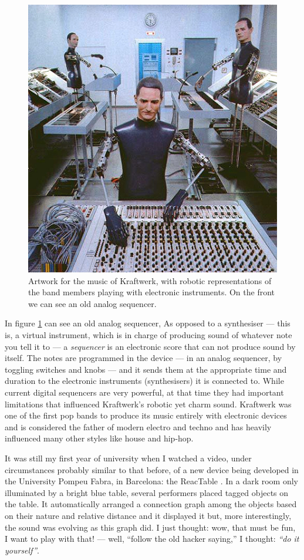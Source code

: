 \begin{figure}[h!]
    \centering
  \includegraphics[width=.6\textwidth]{pic/kraftwerk.jpg}
  \caption[Artwork for the music of Kraftwerk]{Artwork for the music
    of Kraftwerk, with robotic representations of the band members
    playing with electronic instruments. On the front we can see an
    old analog sequencer.}
  \label{fig:kraftwerk}
\end{figure}

\begin{mynote}
  In figure \ref{fig:kraftwerk} can see an old analog sequencer, As
  opposed to a synthesiser --- this is, a virtual
  instrument, which is in charge of
  producing sound of whatever note you tell it to --- a
  \emph{sequencer} is an electronic score that can not produce sound
  by itself. The notes are programmed in the device --- in an analog
  sequencer, by toggling switches and knobs --- and it sends them at
  the appropriate time and duration to the electronic instruments
  (synthesisers) it is connected to. While current digital sequencers
  are very powerful, at that time they had important limitations that
  influenced Kraftwerk's robotic yet charm sound. Kraftwerk was one of
  the first pop bands to produce its music entirely with electronic
  devices and is considered the father of modern electro and techno
  and has heavily influenced many other styles like house and hip-hop.
\end{mynote}

It was still my first year of university when I watched a video, under
circumstances probably similar to that before, of a new device being
developed in the University Pompeu Fabra, in Barcelona: the ReacTable
\cite{jorda07thereactable}. In a dark room only illuminated by a
bright blue table, several performers placed tagged objects on the
table. It automatically arranged a connection graph among the objects
based on their nature and relative distance and it displayed it but,
more interestingly, the sound was evolving as this graph did. I just
thought: wow, that must be fun, I want to play with that!  --- well,
``follow the old hacker saying,'' I thought: \emph{``do it
  yourself''}.

